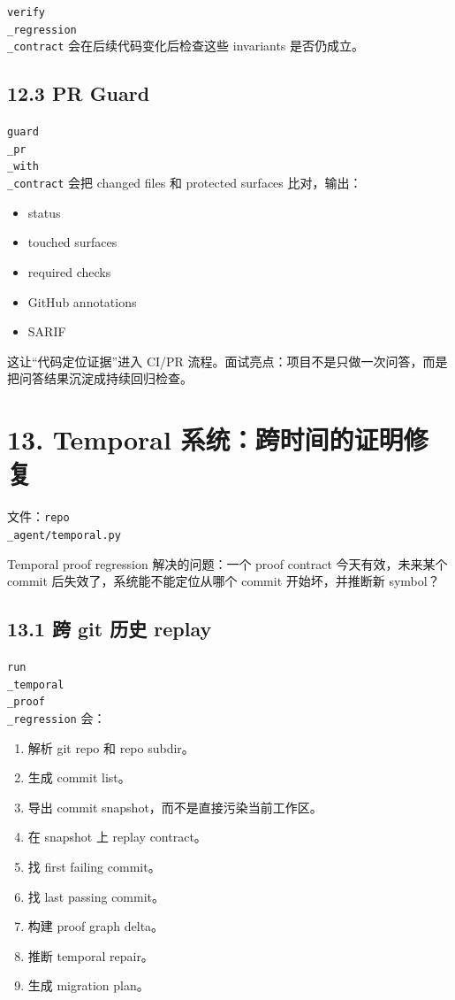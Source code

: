 \documentclass[UTF8,12pt,openany]{ctexbook}
\begin{document}
\texttt{verify\\_regression\\_contract} 会在后续代码变化后检查这些 invariants 是否仍成立。\par

\subsection{12.3 PR Guard}

\texttt{guard\\_pr\\_with\\_contract} 会把 changed files 和 protected surfaces 比对，输出：\par

\begin{itemize}
\item status
\item touched surfaces
\item required checks
\item GitHub annotations
\item SARIF
\end{itemize}

这让“代码定位证据”进入 CI/PR 流程。面试亮点：项目不是只做一次问答，而是把问答结果沉淀成持续回归检查。\par

\section{13. Temporal 系统：跨时间的证明修复}

文件：\texttt{repo\\_agent/temporal.py}\par

Temporal proof regression 解决的问题：一个 proof contract 今天有效，未来某个 commit 后失效了，系统能不能定位从哪个 commit 开始坏，并推断新 symbol？\par

\subsection{13.1 跨 git 历史 replay}

\texttt{run\\_temporal\\_proof\\_regression} 会：\par

\begin{enumerate}
\item 解析 git repo 和 repo subdir。
\item 生成 commit list。
\item 导出 commit snapshot，而不是直接污染当前工作区。
\item 在 snapshot 上 replay contract。
\item 找 first failing commit。
\item 找 last passing commit。
\item 构建 proof graph delta。
\item 推断 temporal repair。
\item 生成 migration plan。
\end{enumerate}
\end{document}
